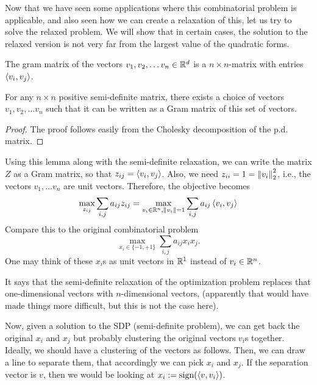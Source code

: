\documentclass[12pt]{article}
\begin{document}
Now that we have seen some applications where this combinatorial problem is applicable, and also seen how we can create a relaxation of this, let us try to solve the relaxed problem. We will show that in certain cases, the solution to the relaxed version is not very far from the largest value of the quadratic forms.

\begin{definitionbox}
    The gram matrix of the vectors $v_1, v_2, \dots v_n \in \mathbb{R}^d$ is a $n\times n$-matrix with entries $\left\langle v_i, v_j \right\rangle$. 
\end{definitionbox}

\begin{lemmabox}
    For any $n \times n$ positive semi-definite matrix, there exists a choice of vectors $v_1, v_2, \dots v_n$ such that it can be written as a Gram matrix of this set of vectors.
\end{lemmabox}

\begin{proof}
    The proof follows easily from the Cholesky decomposition of the p.d. matrix.
\end{proof}

Using this lemma along with the semi-definite relaxation, we can write the matrix $Z$ as a Gram matrix, so that $z_{ij} = \left\langle v_i, v_j \right\rangle$. Also, we need $z_{ii} = 1 = \left\Vert v_i \right\Vert_2^2$, i.e., the vectors $v_1, \dots v_n$ are unit vectors. Therefore, the objective becomes
\begin{equation*}
    \max_{z_{ij}} \sum_{i,j} a_{ij} z_{ij} = \max_{v_i \in \mathbb{R}^n, \left\Vert v_i \right\Vert = 1} \sum_{i,j} a_{ij}\left\langle v_i, v_j \right\rangle
\end{equation*}
\noindent Compare this to the original combinatorial problem
\begin{equation*}
    \max_{x_i \in \{ -1, +1\} } \sum_{i,j} a_{ij}x_i x_j.
\end{equation*}
\noindent One may think of these $x_i$s as unit vectors in $\mathbb{R}^1$ instead of $v_i \in \mathbb{R}^n$.

\begin{note}
    It says that the semi-definite relaxation of the optimization problem replaces that one-dimensional vectors with $n$-dimensional vectors, (apparently that would have made things more difficult, but this is not the case here).
\end{note}

Now, given a solution to the SDP (semi-definite problem), we can get back the original $x_i$ and $x_j$ but probably clustering the original vectors $v_i$s together. Ideally, we should have a clustering of the vectors as follows. Then, we can draw a line to separate them, that accordingly we can pick $x_i$ and $x_j$. If the separation vector is $v$, then we would be looking at $x_i := \text{sign}(\left\langle v, v_i \right\rangle)$. 
\end{document}
